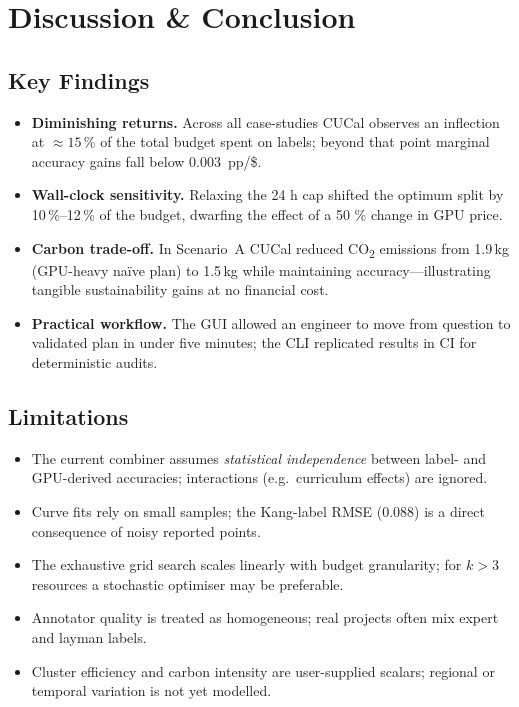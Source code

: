 \documentclass[11pt]{article}
\begin{document}
\section{Discussion \& Conclusion}\label{sec:discussion}
\subsection{Key Findings}
\begin{itemize}
  \item \textbf{Diminishing returns.}  Across all case-studies CUCal
        observes an inflection at $\approx\!15$\,\% of the total budget
        spent on labels; beyond that point marginal accuracy gains fall
        below 0.003~pp/\$.
  \item \textbf{Wall-clock sensitivity.}  Relaxing the 24 h cap shifted
        the optimum split by 10\,\%–12\,\% of the budget, dwarfing the effect
        of a 50 \% change in GPU price.
  \item \textbf{Carbon trade-off.}  In Scenario~A CUCal reduced
        CO\textsubscript{2} emissions from 1.9\,kg (GPU-heavy naïve plan) to
        1.5\,kg while maintaining accuracy—illustrating tangible
        sustainability gains at no financial cost.
  \item \textbf{Practical workflow.}  The GUI allowed an engineer to move
        from question to validated plan in under five minutes; the CLI
        replicated results in CI for deterministic audits.
\end{itemize}

\subsection{Limitations}
\begin{itemize}
  \item The current combiner assumes \emph{statistical independence} between
        label- and GPU-derived accuracies; interactions (e.g.\ curriculum
        effects) are ignored.
  \item Curve fits rely on small samples; the Kang-label RMSE (0.088) is a
        direct consequence of noisy reported points.
  \item The exhaustive grid search scales linearly with budget granularity;
        for \(k\!>\!3\) resources a stochastic optimiser may be preferable.
  \item Annotator quality is treated as homogeneous; real projects often
        mix expert and layman labels.
  \item Cluster efficiency and carbon intensity are user-supplied scalars;
        regional or temporal variation is not yet modelled.
\end{itemize}
\end{document}
